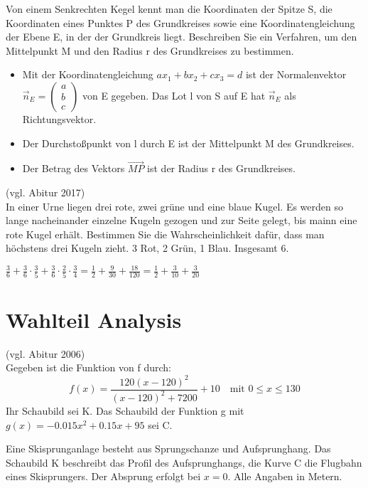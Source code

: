 Von einem Senkrechten Kegel kennt man die Koordinaten der Spitze S, die Koordinaten eines Punktes P des Grundkreises sowie eine Koordinatengleichung der Ebene E, in der der Grundkreis liegt. Beschreiben Sie ein Verfahren, um den Mittelpunkt M und den Radius r des Grundkreises zu bestimmen.
\loesung{}
\begin{itemize}
  \item Mit der Koordinatengleichung $ax_1+bx_2+cx_3=d$ ist der Normalenvektor $\vec n_E=\left(\begin{array}{c}a\\b\\c\end{array}\right)$ von E gegeben.
  Das Lot l von S auf E hat $\vec n_E$ als Richtungsvektor.
  \item Der Durchstoßpunkt von l durch E ist der Mittelpunkt M des Grundkreises.
  \item Der Betrag des Vektors $\overrightarrow{MP}$ ist der Radius r des Grundkreises.
\end{itemize}

 (vgl. Abitur 2017)\\
In einer Urne liegen drei rote, zwei grüne und eine blaue Kugel. Es werden so lange nacheinander einzelne Kugeln gezogen und zur Seite gelegt, bis mainn eine rote Kugel erhält. Bestimmen Sie die Wahrscheinlichkeit dafür, dass man höchstens drei Kugeln zieht.
\loesung{}
3 Rot, 2 Grün, 1 Blau. Insgesamt 6.

$\frac 3 6 + \frac 3 6 \cdot\frac 3 5 + \frac 3 6 \cdot \frac 2 5 \cdot \frac 3 4 = \frac 1 2+\frac{9}{30} +\frac{18}{120}=\frac 1 2 + \frac{3}{10}+  \frac{3}{20}$

\section{Wahlteil Analysis}

\aufgabe{} (vgl. Abitur 2006)\\
Gegeben ist die Funktion von f durch:
\begin{equation*}
  f(x)=\frac{120(x-120)^2}{(x-120)^2+7200} + 10 \quad\text{mit $0\leq x \leq 130$}
\end{equation*}
Ihr Schaubild sei K. Das Schaubild der Funktion g mit $g(x)=-0.015x^2+0.15x+95$ sei C.

Eine Skisprunganlage besteht aus Sprungschanze und Aufsprunghang. Das Schaubild K beschreibt das Profil des Aufsprunghangs, die Kurve C die Flugbahn eines Skisprungers. Der Absprung erfolgt bei $x=0$. Alle Angaben in Metern.

